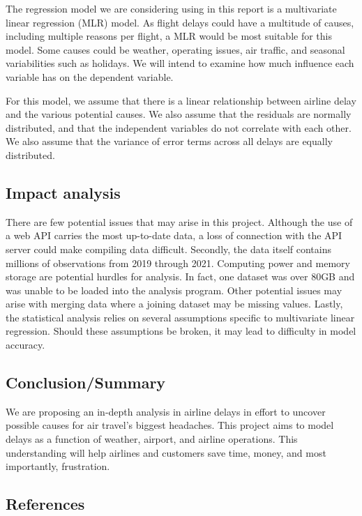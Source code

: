 \documentclass[
]{article}
\begin{document}
The regression model we are considering using in this report is a
multivariate linear regression (MLR) model. As flight delays could have
a multitude of causes, including multiple reasons per flight, a MLR
would be most suitable for this model. Some causes could be weather,
operating issues, air traffic, and seasonal variabilities such as
holidays. We will intend to examine how much influence each variable has
on the dependent variable.

For this model, we assume that there is a linear relationship between
airline delay and the various potential causes. We also assume that the
residuals are normally distributed, and that the independent variables
do not correlate with each other. We also assume that the variance of
error terms across all delays are equally distributed.

\hypertarget{impact-analysis}{%
\subsection{Impact analysis}\label{impact-analysis}}

There are few potential issues that may arise in this project. Although
the use of a web API carries the most up-to-date data, a loss of
connection with the API server could make compiling data difficult.
Secondly, the data itself contains millions of observations from 2019
through 2021. Computing power and memory storage are potential hurdles
for analysis. In fact, one dataset was over 80GB and was unable to be
loaded into the analysis program. Other potential issues may arise with
merging data where a joining dataset may be missing values. Lastly, the
statistical analysis relies on several assumptions specific to
multivariate linear regression. Should these assumptions be broken, it
may lead to difficulty in model accuracy.

\hypertarget{conclusionsummary}{%
\subsection{Conclusion/Summary}\label{conclusionsummary}}

We are proposing an in-depth analysis in airline delays in effort to
uncover possible causes for air travel's biggest headaches. This project
aims to model delays as a function of weather, airport, and airline
operations. This understanding will help airlines and customers save
time, money, and most importantly, frustration.

\hypertarget{references}{%
\subsection{References}\label{references}}
\end{document}
